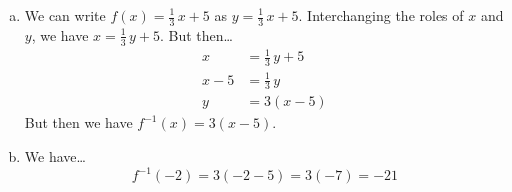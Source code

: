 \documentclass[11pt,letterpaper]{article}
\begin{document}
\sol 
\begin{enumerate}[(a)]
\item We can write $f(x)= \frac{1}{3}\,x + 5$ as $y= \frac{1}{3}\,x + 5$. Interchanging the roles of $x$ and $y$, we have $x= \frac{1}{3}\,y + 5$. But then\dots
	\[
	\begin{aligned}
	x&= \frac{1}{3}\,y + 5 \\[0.3cm]
	x - 5&= \frac{1}{3}\,y \\[0.3cm]
	y&= 3(x - 5)
	\end{aligned}
	\] \pspace
But then we have $f^{-1}(x)= 3(x - 5)$. \pspace

\item We have\dots
	\[
	f^{-1}(-2)= 3(-2 - 5)= 3(-7)= -21
	\]
\end{enumerate}
\end{document}
